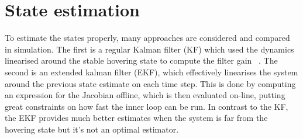 \documentclass{article}
\begin{document}
\section{State estimation}
To estimate the states properly, many approaches are considered and compared in simulation. The first is a regular Kalman filter (KF) which used the dynamics linearised around the stable hovering state to compute the filter gain ~\cite{glad2000control}. The second is an extended kalman filter (EKF), which effectively linearises the system around the previous state estimate on each time step. This is done by computing an expression for the Jacobian offline, which is then evaluated on-line, putting great constraints on how fast the inner loop can be run. In contrast to the KF, the EKF provides much better estimates when the system is far from the hovering state but it's not an optimal estimator.
\end{document}
